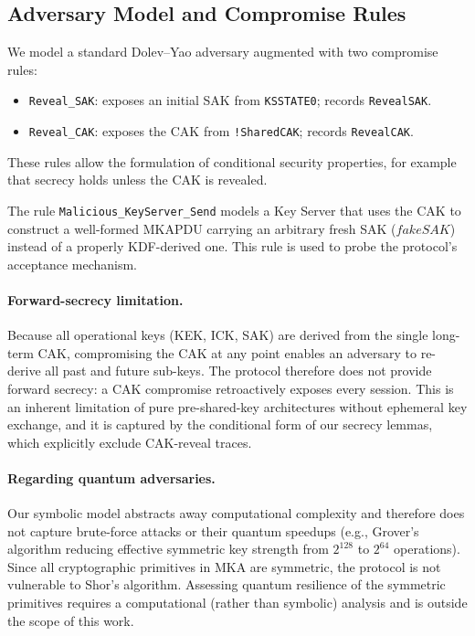 \subsection{Adversary Model and Compromise Rules}

We model a standard Dolev--Yao adversary augmented with two compromise rules:
\begin{itemize}
  \item \texttt{Reveal\_SAK}: exposes an initial SAK from \texttt{KSSTATE0}; records \texttt{RevealSAK}.
  \item \texttt{Reveal\_CAK}: exposes the CAK from \texttt{!SharedCAK}; records \texttt{RevealCAK}.
\end{itemize}
These rules allow the formulation of conditional security properties, for example that secrecy holds unless the CAK is revealed.

\begin{sloppypar}
The rule \texttt{Malicious\_KeyServer\_Send} models a Key Server that uses the CAK to construct a well-formed MKAPDU carrying an arbitrary fresh SAK ($\mathit{fakeSAK}$) instead of a properly KDF-derived one. This rule is used to probe the protocol's acceptance mechanism.
\end{sloppypar}

\paragraph{Forward-secrecy limitation.} Because all operational keys (KEK, ICK, SAK) are derived from the single long-term CAK, compromising the CAK at any point enables an adversary to re-derive all past and future sub-keys. The protocol therefore does not provide forward secrecy: a CAK compromise retroactively exposes every session. This is an inherent limitation of pure pre-shared-key architectures without ephemeral key exchange, and it is captured by the conditional form of our secrecy lemmas, which explicitly exclude CAK-reveal traces.

\paragraph{Regarding quantum adversaries.} Our symbolic model abstracts away computational complexity and therefore does not capture brute-force attacks or their quantum speedups (e.g., Grover's algorithm reducing effective symmetric key strength from $2^{128}$ to $2^{64}$ operations). Since all cryptographic primitives in MKA are symmetric, the protocol is not vulnerable to Shor's algorithm. Assessing quantum resilience of the symmetric primitives requires a computational (rather than symbolic) analysis and is outside the scope of this work.

